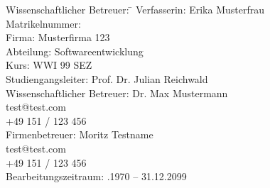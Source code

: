 \begin{titlepage}
\begin{center}
\begin{minipage}{\textwidth}
\begin{tabbing}
	Wissenschaftlicher Betreuer: \hspace{0.85cm}\=\kill
	Verfasserin: \> Erika Musterfrau \\[1.5mm]
	Matrikelnummer:  \\[1.5mm]
	Firma: \> Musterfirma 123 \\[1.5mm]
	Abteilung: \> Softwareentwicklung \\[1.5mm]
	Kurs: \> WWI 99 SEZ \\[1.5mm]
	Studiengangsleiter: \> Prof. Dr. Julian Reichwald  \\[1.5mm]
	Wissenschaftlicher Betreuer: \> Dr. Max Mustermann \\
	\> test@test.com \\
	\> +49 151 / 123 456 \\[1.5mm]
	Firmenbetreuer: \> Moritz Testname \\
	\> test@test.com \\
	\> +49 151 / 123 456 \\[1.5mm]
	Bearbeitungszeitraum: .1970 -- 31.12.2099
\end{tabbing}
\end{minipage}

\end{center}

\end{titlepage}